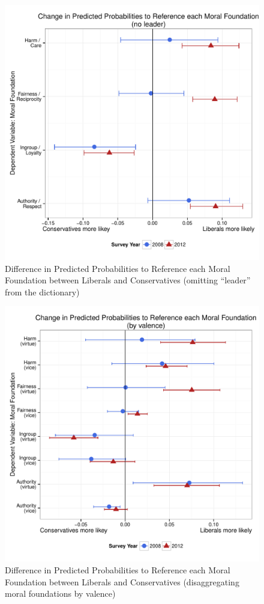 \documentclass[12pt]{article}
\begin{document}
\begin{figure}\centering
\includegraphics[scale=.4]{../calc/fig/m1_mft_noleader.pdf}
\caption{Difference in Predicted Probabilities to Reference each Moral Foundation between Liberals and Conservatives (omitting ``leader'' from the dictionary)}\label{fig:m1_mft_noleader}
\end{figure}

\begin{figure}\centering
\includegraphics[scale=.4]{../calc/fig/m1c_mft.pdf}
\caption{Difference in Predicted Probabilities to Reference each Moral Foundation between Liberals and Conservatives (disaggregating moral foundations by valence)}\label{fig:m1c_mft}
\end{figure}
\end{document}

